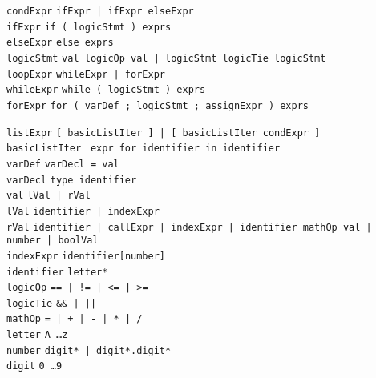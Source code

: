 \documentclass{article}
\newcommand{\keyword}[1]{\colorbox{light-gray}{\texttt{#1}}}
\newcommand{\code}[1]{\texttt{#1}}
\begin{document}
\code{condExpr} \textrightarrow \code{ifExpr | ifExpr elseExpr} \\
\code{ifExpr} \textrightarrow \code{\keyword{if (} logicStmt \keyword{)} exprs } \\
\code{elseExpr} \textrightarrow \code{\keyword{else} exprs} \\
\code{logicStmt} \textrightarrow \code{val logicOp val | logicStmt logicTie logicStmt} \\

\code{loopExpr} \textrightarrow \code{whileExpr | forExpr} \\
\code{whileExpr} \textrightarrow \code{\keyword{while (} logicStmt \keyword{)} exprs} \\
\code{forExpr} \textrightarrow \code{\keyword{for (} varDef \keyword{;} logicStmt \keyword{;} assignExpr \keyword{)} exprs}

\code{listExpr} \textrightarrow \code{\keyword{[} basicListIter \keyword{]} | \keyword{[} basicListIter condExpr \keyword{]} } \\
\code{basicListIter} \textrightarrow \code{ expr \keyword{for} identifier \keyword{in} identifier} \\

\code{varDef} \textrightarrow \code{varDecl \keyword{=} val} \\
\code{varDecl} \textrightarrow \code{type identifier} \\
\code{val} \textrightarrow \code{lVal | rVal} \\
\code{lVal} \textrightarrow \code{identifier | indexExpr} \\
\code{rVal} \textrightarrow \code{identifier | callExpr | indexExpr | identifier mathOp val | number | boolVal} \\
\code{indexExpr} \textrightarrow \code{identifier\keyword{[}number\keyword{]}} \\

\code{identifier} \textrightarrow \code{letter*} \\
\code{logicOp} \textrightarrow \code{\keyword{==} | \keyword{!=} | \keyword{<=} | \keyword{>=}} \\
\code{logicTie} \textrightarrow \code{\keyword{\&\&} | \keyword{||}} \\
\code{mathOp} \textrightarrow \code{\keyword{=} | \keyword{+} | \keyword{-} | \keyword{*} | \keyword{/}} \\
\code{letter} \textrightarrow \code{\keyword{A} \ldots \keyword{z}} \\
\code{number} \textrightarrow \code{digit* | digit*.digit*} \\
\code{digit} \textrightarrow \code{\keyword{0} \ldots \keyword{9}} \\
\end{document}

